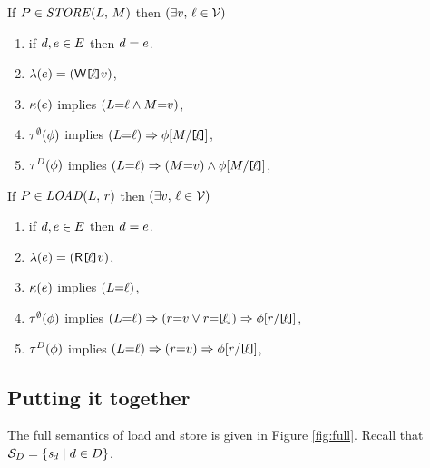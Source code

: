 \begin{definition}
  \noindent
  If $\aPS\SB0 \in \sSTORE{\cExp}{\aExp}$ then
  $(\exists\aVal,\,\cVal\in\Val)$
  \begin{enumerate}
  \item if $\bEv,\aEv\in\aEvs\SB0$ then $\bEv=\aEv$.
  \item $\labelingAct\SB0(\aEv) = \DWP{\REF\cVal}{\aVal}$,
  \item $\labelingForm\SB0(\aEv)$ implies $(\cExp{=}\cVal \land \aExp{=}\aVal)$,
  \item $\aTr[\emptyset]\SB0(\aForm)$ implies $(\cExp{=}\cVal) \limplies \aForm[\aExp/\REF{\cVal}]$,
  \item $\aTr[\bEvs]\SB0(\aForm)$ implies $(\cExp{=}\cVal) \limplies (\aExp{=}\aVal) \land \aForm[\aExp/\REF{\cVal}]$, 
  \end{enumerate}

  \noindent
  If $\aPS\SB0 \in \sLOAD{\cExp}{\aReg}$ then
  $(\exists\aVal,\,\cVal\in\Val)$
  \begin{enumerate}
  \item if $\bEv,\aEv\in\aEvs\SB0$ then $\bEv=\aEv$.
  \item $\labelingAct\SB0(\aEv) = \DRP{\REF{\cVal}}{\aVal}$,
  \item $\labelingForm\SB0(\aEv)$ implies $(\cExp{=}\cVal)$,
  \item $\aTr[\emptyset]\SB0(\aForm)$ implies
    $(\cExp{=}\cVal) \limplies (\aReg{=}\aVal\lor\aReg{=}\REF{\cVal})\limplies\aForm[\aReg/\REF{\cVal}]$,
  \item $\aTr[\bEvs]\SB0(\aForm)$ implies
    $(\cExp{=}\cVal) \limplies (\aReg{=}\aVal)\limplies\aForm[\aReg/\REF{\cVal}]$, 
  \end{enumerate}  
\end{definition}

\subsection{Putting it together}

The full semantics of load and store is given in Figure \ref{fig:full}.
Recall that $\uRegs{\bEvs}=\{\uReg{\bEv}\mid\bEv\in\bEvs\}$.


